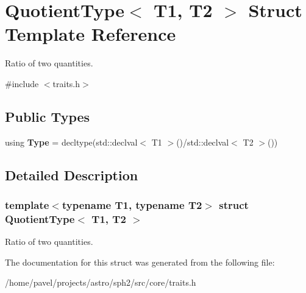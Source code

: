 \hypertarget{structQuotientType}{}\section{Quotient\+Type$<$ T1, T2 $>$ Struct Template Reference}
\label{structQuotientType}


Ratio of two quantities.  




{\ttfamily \#include $<$traits.\+h$>$}

\subsection*{Public Types}
\begin{DoxyCompactItemize}
\item 
\hypertarget{structQuotientType_ab2538562c0ae0fc232064bfaa50e3990}{}\label{structQuotientType_ab2538562c0ae0fc232064bfaa50e3990} 
using {\bfseries Type} = decltype(std\+::declval$<$ T1 $>$()/std\+::declval$<$ T2 $>$())
\end{DoxyCompactItemize}


\subsection{Detailed Description}
\subsubsection*{template$<$typename T1, typename T2$>$\newline
struct Quotient\+Type$<$ T1, T2 $>$}

Ratio of two quantities. 

The documentation for this struct was generated from the following file\+:\begin{DoxyCompactItemize}
\item 
/home/pavel/projects/astro/sph2/src/core/traits.\+h\end{DoxyCompactItemize}
